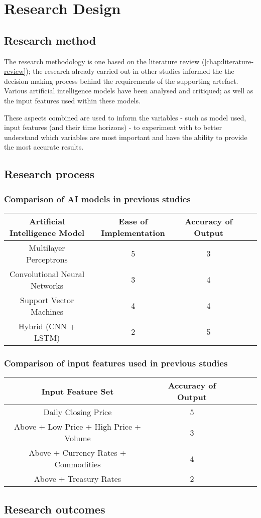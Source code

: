 \chapter{Research Design} \label{chap:research-design}
\section{Research method}
The research methodology is one based on the literature review (\autoref{chap:literature-review});
the research already carried out in other studies
informed the the decision making process behind the requirements of the supporting artefact. Various artificial
intelligence models have been analysed and critiqued; as well as the input features used within these models.

These aspects combined are used to inform the variables - such as model used, input features
(and their time horizons) - to experiment with to better understand which variables are most important
and have the ability to provide the most accurate results.


\section{Research process}
\subsection{Comparison of AI models in previous studies}
\begin{table}
    \centering
\begin{tabular}{|c|c|c|c|c|}
    \hline
    Artificial Intelligence Model & Ease of Implementation & Accuracy of Output \\
    \hline\hline
    Multilayer Perceptrons & 5 & 3 \\
    Convolutional Neural Networks & 3 & 4 \\
    Support Vector Machines & 4 & 4 \\
    Hybrid (CNN + LSTM) & 2 & 5 \\
    \hline
\end{tabular}
\end{table}

\subsection{Comparison of input features used in previous studies}
\begin{table}
    \centering
\begin{tabular}{|c|c|c|c|c|}
    \hline
    Input Feature Set & Accuracy of Output \\
    \hline\hline
    Daily Closing Price & 5\\
    Above + Low Price + High Price + Volume & 3\\
    Above + Currency Rates + Commodities & 4\\
    Above + Treasury Rates & 2\\
    \hline
\end{tabular}
\end{table}

\section{Research outcomes}